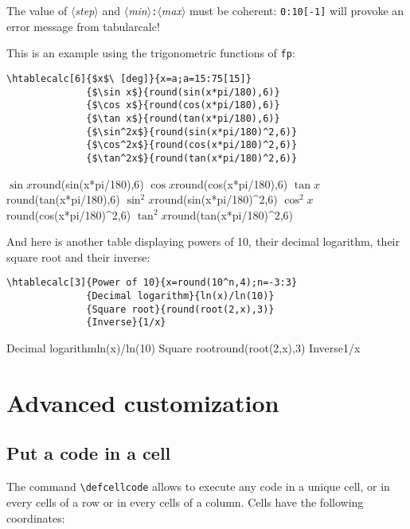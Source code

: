 \documentclass[a4paper,10pt]{article}
\newcommand\argu[1]{$\langle$\textit{#1}$\rangle$}
\newcommand\tbcalc{\textsf{tabularcalc}\xspace}
\newcommand\verbinline{\lstinline[breaklines=false,basicstyle=\normalsize\ttfamily]}
\newcommand\mywidth{0.85\linewidth}
\begin{document}
The value of \argu{step} and \argu{min}\verb|:|\argu{max} must be coherent: \verb|0:10[-1]| will provoke an error message from \tbcalc!\medskip

This is an example using the trigonometric functions of \verb|fp|:
\begin{center}
\begin{minipage}{\mywidth}
\begin{lstlisting}
\htablecalc[6]{$x$\ [deg]}{x=a;a=15:75[15]}
              {$\sin x$}{round(sin(x*pi/180),6)}
              {$\cos x$}{round(cos(x*pi/180),6)}
              {$\tan x$}{round(tan(x*pi/180),6)}
              {$\sin^2x$}{round(sin(x*pi/180)^2,6)}
              {$\cos^2x$}{round(cos(x*pi/180)^2,6)}
              {$\tan^2x$}{round(tan(x*pi/180)^2,6)}
\end{lstlisting}
\end{minipage}

              {$\sin x$}{round(sin(x*pi/180),6)}
              {$\cos x$}{round(cos(x*pi/180),6)}
              {$\tan x$}{round(tan(x*pi/180),6)}
              {$\sin^2x$}{round(sin(x*pi/180)^2,6)}
              {$\cos^2x$}{round(cos(x*pi/180)^2,6)}
              {$\tan^2x$}{round(tan(x*pi/180)^2,6)}
\end{center}
\medskip

And here is another table displaying powers of 10, their decimal logarithm, their square root and their inverse:
\begin{center}
\begin{minipage}{\mywidth}
\begin{lstlisting}
\htablecalc[3]{Power of 10}{x=round(10^n,4);n=-3:3}
              {Decimal logarithm}{ln(x)/ln(10)}
              {Square root}{round(root(2,x),3)}
              {Inverse}{1/x}
\end{lstlisting}
\end{minipage}

              {Decimal logarithm}{ln(x)/ln(10)}
              {Square root}{round(root(2,x),3)}
              {Inverse}{1/x}
\end{center}

\section{Advanced customization}
\subsection{Put a code in a cell}
The command \verbinline|\defcellcode| allows to execute any code in a unique cell, or in every cells of a row or in every cells of a column. Cells have the following coordinates:
\end{document}
